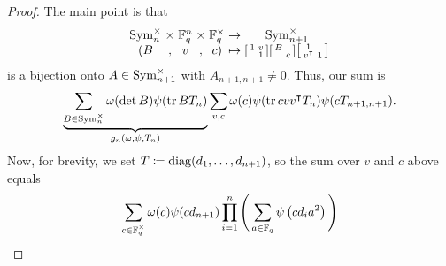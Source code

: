 \begin{proof}
    The main point is that
    \[\arraycolsep=1.4pt\begin{array}{ccccccc}
        \operatorname{Sym}_n^\times & \times & \FF_q^n & \times & \FF_q^\times & \to & \Sym_{n+1}^\times \\
        (B & , & v & , & c) & \mapsto & \displaystyle\begin{bsmallmatrix}
            1 & v \\
              & 1
        \end{bsmallmatrix}\begin{bsmallmatrix}
            B \\ & c
        \end{bsmallmatrix}\begin{bsmallmatrix}
            1 \\ v^\intercal & 1
        \end{bsmallmatrix}
    \end{array}\]
    is a bijection onto $A\in\operatorname{Sym}_{n+1}^\times$ with $A_{n+1,n+1}\ne0$. 
    Thus, our sum is
    \[\underbrace{\sum_{B\in\operatorname{Sym}_n^\times}\omega(\det B)\psi(\operatorname{tr} BT_n)}_{g_n(\omega,\psi,T_n)}\sum_{v,c}\omega(c)\psi(\operatorname{tr} cvv^\intercal T_n)\psi(cT_{n+1,n+1}).\]
    Now, for brevity, we set $T\coloneqq\operatorname{diag}(d_1,\ldots,d_{n+1})$, so the sum over $v$ and $c$ above equals
    \[\sum_{c\in\mathbb F_q^\times}\omega(c)\psi(cd_{n+1})\prod_{i=1}^n\Bigg(\sum_{a\in\mathbb F_q}\psi\left(cd_ia^2\right)\Bigg)\]

\end{proof}
